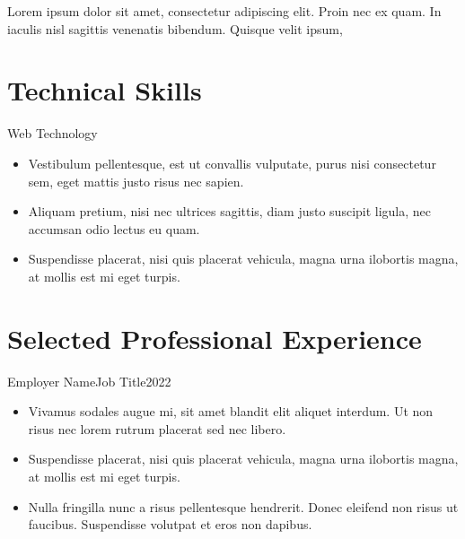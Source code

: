\documentclass{cv}
\author{Your Name}
\begin{document}
	\maketitle
	
\begin{summary}
Lorem ipsum dolor sit amet, consectetur adipiscing elit. Proin nec ex 
quam. In iaculis nisl sagittis venenatis bibendum. Quisque velit ipsum, 
\end{summary}

\section*{Technical Skills}

\begin{entry}{Web Technology}{~}{~}
	\begin{itemize}

	\item	Vestibulum pellentesque, est ut convallis vulputate, purus nisi 
			consectetur sem, eget mattis justo risus nec sapien. 

	\item	Aliquam pretium, nisi nec ultrices sagittis, diam justo suscipit 
			ligula, nec accumsan odio lectus eu quam.

	\item	Suspendisse placerat, nisi quis placerat vehicula, magna urna 
			ilobortis magna, at mollis est mi eget turpis. 

	\end{itemize}
\end{entry}

\section*{Selected Professional Experience}

\begin{entry}{Employer Name}{Job Title}{2022}
	\begin{itemize}

	\item	Vivamus sodales augue mi, sit amet blandit elit aliquet interdum. 
			Ut non risus nec lorem rutrum placerat sed nec libero. 

	\item	Suspendisse placerat, nisi quis placerat vehicula, magna urna 
			ilobortis magna, at mollis est mi eget turpis. 

	\item	Nulla fringilla nunc a risus pellentesque hendrerit. Donec eleifend non 
			risus ut faucibus. Suspendisse volutpat et eros non dapibus. 

	\end{itemize}
\end{entry}
\end{document}
